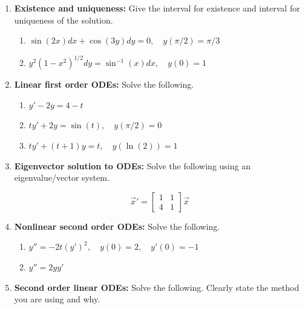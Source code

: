 \documentclass[letterpaper, fontsize=11pt]{scrartcl} %
\numberwithin{equation}{section} %
\numberwithin{figure}{section} %
\numberwithin{table}{section} %
\begin{document}
\begin{enumerate}
\begin{enumerate}
\end{enumerate}

\item \textbf{Existence and uniqueness:} Give the interval for existence and interval for uniqueness of the solution. 
\begin{enumerate}

\item $\sin(2x)dx+\cos(3y)dy=0, \quad y(\pi/2) = \pi/3$

\item $y^2(1 - x^2)^{1/2}dy = \sin^{-1} (x) dx, \quad y(0) = 1$

\end{enumerate}

\item \textbf{Linear first order ODEs:} Solve the following.
\begin{enumerate}

\item $y' -2y = 4-t$

\item $ty' + 2y = \sin(t),\quad y(\pi/2) = 0$

\item $ty' + (t+1)y = t,\quad y(\ln(2)) = 1$

\end{enumerate}


\item \textbf{Eigenvector solution to ODEs:} Solve the following using an eigenvalue/vector system.

\[
\vec x' = \left[ \begin{array}{cc} 1 & 1 \\ 4 &1 \end{array} \right] \vec x
\]

\item \textbf{Nonlinear second order ODEs:} Solve the following. 
\begin{enumerate}

\item $y''  = -2t(y')^2, \quad y(0) = 2, \quad y'(0) = -1$

\item $y'' = 2y y'$

\end{enumerate}


\item \textbf{Second order linear ODEs:} Solve the following. Clearly state the method you are using and why.
\begin{enumerate}


\end{enumerate}
\end{enumerate}
\end{document}
